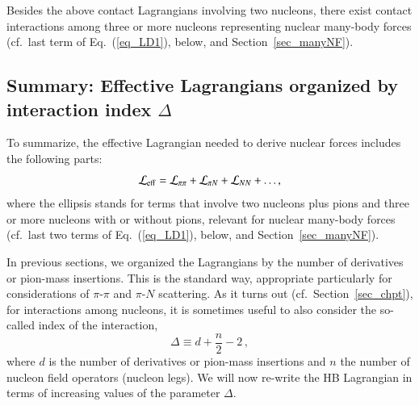 \documentclass[sort&compress,preprint,3p]{elsarticle}
\begin{document}
Besides the above contact Lagrangians involving two nucleons,
there exist contact interactions among three or more nucleons
representing nuclear many-body forces 
(cf.\ last term of Eq.~(\ref{eq_LD1}), below, and Section~\ref{sec_manyNF}).


\subsection{Summary: Effective Lagrangians organized by 
interaction index $\Delta$}

To summarize, the effective Lagrangian needed to derive nuclear
forces includes the following parts:
\begin{equation}
{\cal L_{\rm eff}} 
=
{\cal L}_{\pi\pi} 
+
{\cal L}_{\pi N} 
+
{\cal L}_{NN} 
+ \ldots ,
\end{equation}
where the ellipsis stands for terms that involve two nucleons plus
pions and three or more
nucleons with or without pions, relevant for nuclear
many-body forces 
(cf.\ last two terms of Eq.~(\ref{eq_LD1}), below, and Section~\ref{sec_manyNF}).

In previous sections, we organized the Lagrangians by the number
of derivatives or pion-mass insertions. This is 
the standard way, appropriate particularly for
considerations of $\pi$-$\pi$ and $\pi$-$N$ scattering.
As it turns out (cf.\ Section~\ref{sec_chpt}), 
for interactions among nucleons,
it is sometimes useful to also consider the so-called
index of the interaction,
\begin{equation}
\Delta  \equiv   d + \frac{n}{2} - 2  \, ,
\label{eq_Delta}
\end{equation}
where $d$ is the number of derivatives or pion-mass insertions 
and $n$ the number of nucleon field operators (nucleon legs).
We will now re-write the HB Lagrangian in terms
of increasing values of the parameter $\Delta$.
\end{document}
